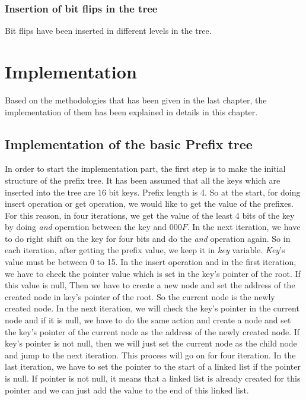 \documentclass{report}
\begin{document}
\subsection{Insertion of bit flips in the tree}

Bit flips have been inserted in different levels in the tree. 

\chapter{Implementation}

Based on the methodologies that has been given in the last chapter, the implementation of them has been explained in details in this chapter.

\section{Implementation of the basic Prefix tree}

In order to start the implementation part, the first step is to make the initial structure of the prefix tree. It has been assumed that all the keys which are inserted into the tree are 16 bit keys. Prefix length is 4. So at the start, for doing insert operation or get operation, we would like to get the value of the prefixes. For this reason, in four iterations, we get the value of the least 4 bits of the key by doing \textit{and} operation between the key and $000F$. In the next iteration, we have to do right shift on the key for four bits and do the \textit{and} operation again. So in each iteration, after getting the prefix value, we keep it in \textit{key} variable. \textit{Key}'s value must be between 0 to 15. In the insert operation and in the first iteration, we have to check the pointer value which is set in the key's pointer of the root. If this value is null, Then we have to create a new node and set the address of the created node in key's pointer of the root. So the current node is the newly created node. In the next iteration, we will check the key's pointer in the current node and if it is null, we have to do the same action and create a node and set the key's pointer of the current node as the address of the newly created node. If key's pointer is not null, then we will just set the current node as the child node and jump to the next iteration. This process will go on for four iteration. In the last iteration, we have to set the pointer to the start of a linked list if the pointer is null. If pointer is not null, it means that a linked list is already created for this pointer and we can just add the value to the end of this linked list.     
\end{document}
